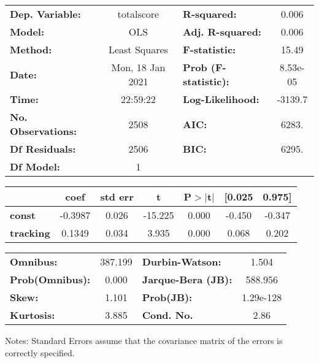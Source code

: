 \begin{center}
\begin{tabular}{lclc}
\toprule
\textbf{Dep. Variable:}    &    totalscore    & \textbf{  R-squared:         } &     0.006   \\
\textbf{Model:}            &       OLS        & \textbf{  Adj. R-squared:    } &     0.006   \\
\textbf{Method:}           &  Least Squares   & \textbf{  F-statistic:       } &     15.49   \\
\textbf{Date:}             & Mon, 18 Jan 2021 & \textbf{  Prob (F-statistic):} &  8.53e-05   \\
\textbf{Time:}             &     22:59:22     & \textbf{  Log-Likelihood:    } &   -3139.7   \\
\textbf{No. Observations:} &        2508      & \textbf{  AIC:               } &     6283.   \\
\textbf{Df Residuals:}     &        2506      & \textbf{  BIC:               } &     6295.   \\
\textbf{Df Model:}         &           1      & \textbf{                     } &             \\
\bottomrule
\end{tabular}
\begin{tabular}{lcccccc}
                  & \textbf{coef} & \textbf{std err} & \textbf{t} & \textbf{P$> |$t$|$} & \textbf{[0.025} & \textbf{0.975]}  \\
\midrule
\textbf{const}    &      -0.3987  &        0.026     &   -15.225  &         0.000        &       -0.450    &       -0.347     \\
\textbf{tracking} &       0.1349  &        0.034     &     3.935  &         0.000        &        0.068    &        0.202     \\
\bottomrule
\end{tabular}
\begin{tabular}{lclc}
\textbf{Omnibus:}       & 387.199 & \textbf{  Durbin-Watson:     } &     1.504  \\
\textbf{Prob(Omnibus):} &   0.000 & \textbf{  Jarque-Bera (JB):  } &   588.956  \\
\textbf{Skew:}          &   1.101 & \textbf{  Prob(JB):          } & 1.29e-128  \\
\textbf{Kurtosis:}      &   3.885 & \textbf{  Cond. No.          } &      2.86  \\
\bottomrule
\end{tabular}
\end{center}

Notes: \newline
 [1] Standard Errors assume that the covariance matrix of the errors is correctly specified.
